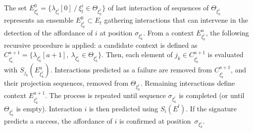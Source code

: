 \documentclass[conference]{IEEEtran}
\begin{document}
The set $E_{\xi_k^i}^0=\{\lambda_{\xi_l^i}[0] ~/~\xi_l^i \in \Theta_{\xi_k^i}\}$ of last interaction of sequences of $\Theta_{\xi_k^i}$ represents an ensemble $E_{\xi_k^i}^0 \subset E_t$ gathering interactions that can intervene in the detection of the affordance of $i$ at position $\sigma_{\xi_k^i}$.
From a context $E_{\xi_k^i}^a$, the following recursive procedure is applied: a candidate context is defined as $C_{\xi_k^i}^{a+1} = \{\lambda_{\xi_k^i}[a+1] ,~ \lambda_{\xi_k^i} \in \Theta_{\xi_k^i} \} $. Then, each element of $j_k \in C_{\xi_k^i}^{a+1}$ is evaluated with $S_{j_k}(E_{\xi_k^i}^a)$. Interactions predicted as a failure are removed from $C_{\xi_k^i}^{a+1}$, and their projection sequences, removed from $\Theta_{\xi_k^i}$. Remaining interactions define context $E_{\xi_k^i}^{a+1}$. The process is repeated until sequence $\sigma_{\xi_k^i}$ is completed (or until $\Theta_{\xi_k^i}$ is empty). Interaction $i$ is then predicted using $S_i(E^l)$. If the signature predicts a success, the affordance of $i$ is confirmed at position~$\sigma_{\xi_k^i}$.





\end{document}
